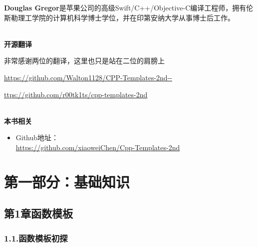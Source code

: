 \documentclass[11pt,a4paper,UTF8]{book}
\begin{document}
\begin{sloppypar}
	\textbf{Douglas Gregor}是苹果公司的高级Swift/C++/Objective-C编译工程师，拥有伦斯勒理工学院的计算机科学博士学位，并在印第安纳大学从事博士后工作。
	
	\hspace*{\fill} \\ %
	\noindent\textbf{开源翻译}
	
	非常感谢两位的翻译，这里也只是站在二位的肩膀上
	
	\url{https://github.com/Walton1128/CPP-Templates-2nd--}
	
	\url{ttps://github.com/r00tk1ts/cpp-templates-2nd}
	
	
	\hspace*{\fill} \\ %
	\noindent\textbf{本书相关}
	\begin{itemize}
		\item Github地址：\\\url{https://github.com/xiaoweiChen/Cpp-Templates-2nd}
	\end{itemize}
	\newpage
	
	\pagestyle{empty}
	
	\newpage
	
	\pagestyle{empty}
	
	\newpage
	
	\pagestyle{empty}
	
	\newpage
	
	\pagestyle{empty}
	
	\newpage
	
	\tableofcontents
	\newpage

	
	\color{white}
	\section*{第一部分：基础知识}
	\pagecolor{mygray}
	\textbf{}
	\newpage
	\color{black}
	\pagecolor{white}

	\subsection*{ 第1章\hspace{0.5cm}函数模板}
	
	
	\subsubsection*{ 1.1.\hspace{0.2cm}函数模板初探}
	
	

\end{sloppypar}
\end{document}
